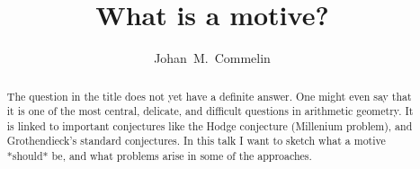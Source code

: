 \documentclass[a4paper,10pt]{article}
\title{What is a motive?}
\author{Johan~M.~Commelin}
\begin{document}
\maketitle

\begin{abstract} %
	The question in the title does not yet have a definite answer. One
	might even say that it is one of the most central, delicate, and
	difficult questions in arithmetic geometry. It is linked to important
	conjectures like the Hodge conjecture (Millenium problem), and
	Grothendieck's standard conjectures. In this talk I want to sketch what
	a motive *should* be, and what problems arise in some of the
	approaches.
\end{abstract} %
\end{document}
